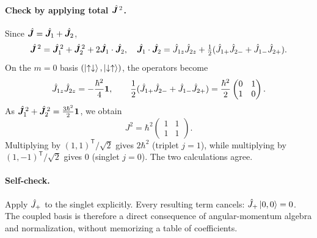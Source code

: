 \paragraph{Check by applying total $\hat{\bm{J}}^{\,2}$.}
Since $\hat{\bm{J}}=\hat{\bm{J}}_1+\hat{\bm{J}}_2$,
\begin{equation}
\hat{\bm{J}}^{\,2}
=\hat{\bm{J}}_1^{\,2}+\hat{\bm{J}}_2^{\,2}
+2\hat{\bm{J}}_1\cdot\hat{\bm{J}}_2,
\quad
\hat{\bm{J}}_1\cdot\hat{\bm{J}}_2
=\hat{J}_{1z}\hat{J}_{2z}
+\tfrac12(\hat{J}_{1+}\hat{J}_{2-}
+\hat{J}_{1-}\hat{J}_{2+}).
\end{equation}
On the $m=0$ basis
$(\left|\uparrow\downarrow\right\rangle,\left|\downarrow\uparrow\right\rangle)$,
the operators become
\begin{equation}
\hat{J}_{1z}\hat{J}_{2z}
=-\frac{\hbar^2}{4}\mathbf1,\qquad
\frac12(\hat{J}_{1+}\hat{J}_{2-}
+\hat{J}_{1-}\hat{J}_{2+})
=\frac{\hbar^2}{2}
 \begin{pmatrix}0&1\\1&0\end{pmatrix}.
\end{equation}
As $\hat{\bm{J}}_1^{\,2}+\hat{\bm{J}}_2^{\,2}
=\frac{3\hbar^2}{2}\mathbf1$, we obtain
\begin{equation}
J^2=\hbar^2
\begin{pmatrix}1&1\\1&1\end{pmatrix}.
\end{equation}
Multiplying by $(1,1)^{\mathsf T}/\sqrt2$ gives
$2\hbar^2$ (triplet $j=1$), while multiplying
by $(1,-1)^{\mathsf T}/\sqrt2$ gives $0$
(singlet $j=0$). The two calculations agree.

\paragraph{Self-check.}
Apply $\hat{J}_+$ to the singlet explicitly.
Every resulting term cancels: $\hat{J}_+\left|0,0\right\rangle=0$.
The coupled basis is therefore a direct consequence of
angular-momentum algebra and normalization, without
memorizing a table of coefficients.

